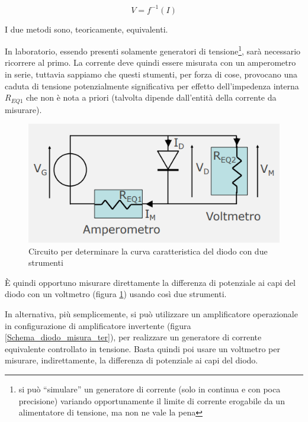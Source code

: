 \documentclass{article}
\begin{document}
\[V = f^{-1}(I)\]

I due metodi sono, teoricamente, equivalenti. 

\vspace{1mm}

In laboratorio, essendo presenti solamente generatori di tensione\footnote{si può “simulare” un generatore di corrente (solo in continua e con poca precisione) variando opportunamente il limite di corrente erogabile da un alimentatore di tensione, ma non ne vale la pena}, sarà necessario ricorrere al primo. La corrente deve quindi essere misurata con un amperometro in serie, tuttavia sappiamo che questi stumenti, per forza di cose, provocano una caduta di tensione potenzialmente significativa per effetto dell’impedenza interna $R_{EQ1}$ che non è nota a priori (talvolta dipende dall’entità della corrente da misurare). 

\begin{figure}[h]
  \centering
  \includegraphics[scale=0.7]{IM_diodo_misura_bis}
  \caption{Circuito per determinare la curva caratteristica del diodo con due strumenti}
  \label{Schema_diodo_misura_bis}
\end{figure}

È quindi opportuno misurare direttamente la differenza di potenziale ai capi del diodo con un voltmetro (figura \ref{Schema_diodo_misura_bis}) usando così due strumenti.

\vspace{3mm}

In alternativa, più semplicemente, si può utilizzare un amplificatore operazionale in configurazione di amplificatore invertente (figura \ref{Schema_diodo_misura_ter}), per realizzare un generatore di corrente equivalente controllato in 
tensione. Basta quindi poi usare un voltmetro per misurare, indirettamente, la differenza di potenziale ai capi del diodo.
\end{document}
